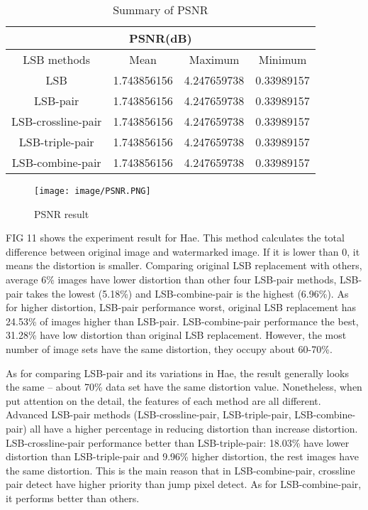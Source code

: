\documentclass[%
    reprint,
    amsmath,amssymb,
    aps,
   ]{revtex4-1}
\begin{document}
   \begin{table*}
   \begin{tabular}{ |c|c|c|c|  }
    \hline
    \multicolumn{4}{|c|}{PSNR(dB)} \\
    \hline
    LSB methods        &Mean           &Maximum        &Minimum\\
    \hline
    LSB                &1.743856156    &4.247659738    &0.33989157\\
    \hline
    LSB-pair           &1.743856156	&4.247659738	&0.33989157\\
    \hline
    LSB-crossline-pair &1.743856156    &4.247659738    &0.33989157\\
    \hline
    LSB-triple-pair    &1.743856156    &4.247659738    &0.33989157\\
    \hline
    LSB-combine-pair   &1.743856156    &4.247659738    &0.33989157\\
    \hline
   \end{tabular}
    \caption{Summary of PSNR}
   \end{table*}
   
   \begin{figure}[h]
   \texttt{[image: image/PSNR.PNG]}
   \caption{PSNR result}
   \label{fig:figure}
   \end{figure} 
   
   
   FIG 11 shows the experiment result for Hae. This method calculates the total difference between original image and watermarked image. If it is lower than 0, it means the distortion is smaller. Comparing original LSB replacement with others, average 6\% images have lower distortion than other four LSB-pair methods, LSB-pair takes the lowest (5.18\%) and LSB-combine-pair is the highest (6.96\%). As for higher distortion, LSB-pair performance worst, original LSB replacement has 24.53\% of images higher than LSB-pair. LSB-combine-pair performance the best, 31.28\% have low distortion than original LSB replacement. However, the most number of image sets have the same distortion, they occupy about 60-70\%. 
   
   As for comparing LSB-pair and its variations in Hae, the result generally looks the same – about 70\% data set have the same distortion value. Nonetheless, when put attention on the detail, the features of each method are all different. Advanced LSB-pair methods (LSB-crossline-pair, LSB-triple-pair, LSB-combine-pair) all have a higher percentage in reducing distortion than increase distortion. LSB-crossline-pair performance better than LSB-triple-pair: 18.03\% have lower distortion than LSB-triple-pair and 9.96\% higher distortion, the rest images have the same distortion. This is the main reason that in LSB-combine-pair, crossline pair detect have higher priority than jump pixel detect. As for LSB-combine-pair, it performs better than others.
   
\end{document}
